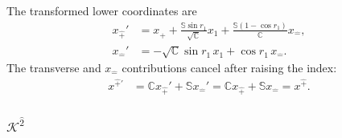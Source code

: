 \documentclass[foundations,article,submit,pdftex,moreauthors]{Definitions/mdpi}
\begin{document}
The transformed lower coordinates are
\begin{align}
x_{\hat{+}}'&=x_{\hat{+}}
 +\frac{\mathbb{S}\sin r_1}{\sqrt{\mathbb{C}}}x_1
 +\frac{\mathbb{S}(1-\cos r_1)}{\mathbb{C}}x_{\hat{-}}, \nonumber\\
x_{\hat{-}}'&=-\sqrt{\mathbb{C}}\sin r_1\,x_1
 +\cos r_1\,x_{\hat{-}}.
\end{align}
The transverse and $x_{\hat{-}}$ contributions cancel after raising the
index:
\begin{align}
x^{\hat{+}\prime}
&=\mathbb{C}x_{\hat{+}}'+\mathbb{S}x_{\hat{-}}'
=\mathbb{C}x_{\hat{+}}+\mathbb{S}x_{\hat{-}}
=x^{\hat{+}}.
\end{align}

\subsubsection{\texorpdfstring{$\mathcal{K}^{\hat{2}}$}{K2}}
\end{document}

